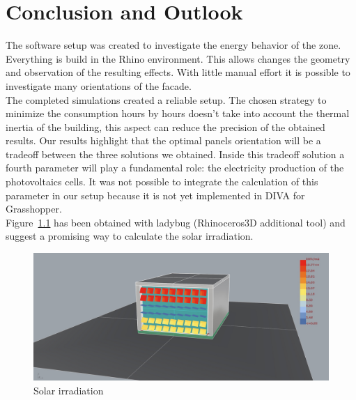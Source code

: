 \chapter{Conclusion and Outlook}

The software setup was created to investigate the energy behavior of the zone. Everything is build in the Rhino environment. This allows changes the geometry and observation of the resulting effects.
With little manual effort it is possible to investigate many orientations of the facade.\\
The completed simulations created a reliable setup. The chosen strategy to minimize the consumption hours by hours doesn't take into account the thermal inertia of the building, this aspect can reduce the precision of the obtained results.
Our results highlight that the optimal panels orientation will be a tradeoff between the three solutions we obtained. Inside this tradeoff solution a fourth parameter will play a fundamental role: the electricity production of the photovoltaics cells. It was not possible to integrate the calculation of this parameter in our setup because it is not yet implemented in DIVA for Grasshopper.\\
Figure~\ref{lady} has been obtained with ladybug (Rhinoceros3D additional tool) and suggest a promising way to calculate the solar irradiation.

\begin{figure}[h]
 \centering
 \includegraphics[width=150mm]{graphic/Ladybug_legend.png}
 \caption{Solar irradiation}
 \label{lady}
\end{figure}